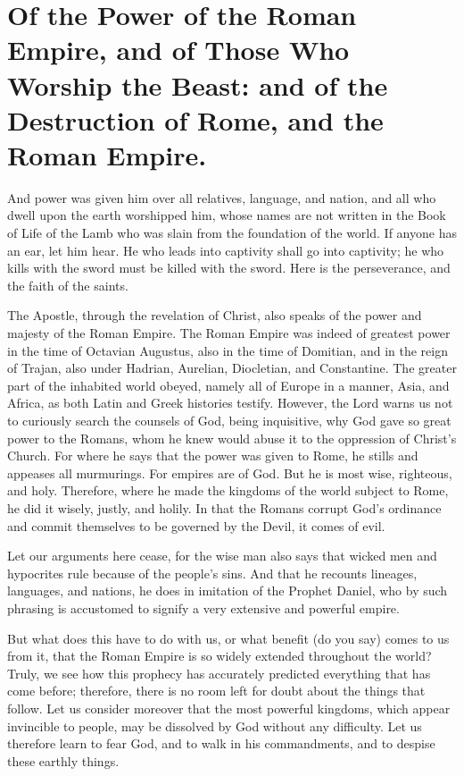 \chapter[Sermon 57. Of the Power of the Roman Empire, and of Those Who Worship the Beast: and of the Destruction of Rome, and the Roman Empire.]{Of the Power of the Roman Empire, and of Those Who Worship the Beast: and of the Destruction of Rome, and the Roman Empire.}
\label{sermon:057}

And power was given him over all relatives, language, and nation, and all who dwell upon the earth worshipped him, whose names are not written in the Book of Life of the Lamb who was slain from the foundation of the world. If anyone has an ear, let him hear. He who leads into captivity shall go into captivity; he who kills with the sword must be killed with the sword. Here is the perseverance, and the faith of the saints.

The Apostle, through the revelation of Christ, also speaks of the power and majesty of the Roman Empire. The Roman Empire was indeed of greatest power in the time of Octavian Augustus, also in the time of Domitian, and in the reign of Trajan, also under Hadrian, Aurelian, Diocletian, and Constantine. The greater part of the inhabited world obeyed, namely all of Europe in a manner, Asia, and Africa, as both Latin and Greek histories testify. However, the Lord warns us not to curiously search the counsels of God, being inquisitive, why God gave so great power to the Romans, whom he knew would abuse it to the oppression of Christ’s Church. For where he says that the power was given to Rome, he stills and appeases all murmurings. For empires are of God. But he is most wise, righteous, and holy. Therefore, where he made the kingdoms of the world subject to Rome, he did it wisely, justly, and holily. In that the Romans corrupt God’s ordinance and commit themselves to be governed by the Devil, it comes of evil.

Let our arguments here cease, for the wise man also says that wicked men and hypocrites rule because of the people’s sins. And that he recounts lineages, languages, and nations, he does in imitation of the Prophet Daniel, who by such phrasing is accustomed to signify a very extensive and powerful empire.

But what does this have to do with us, or what benefit (do you say) comes to us from it, that the Roman Empire is so widely extended throughout the world? Truly, we see how this prophecy has accurately predicted everything that has come before; therefore, there is no room left for doubt about the things that follow. Let us consider moreover that the most powerful kingdoms, which appear invincible to people, may be dissolved by God without any difficulty. Let us therefore learn to fear God, and to walk in his commandments, and to despise these earthly things.

